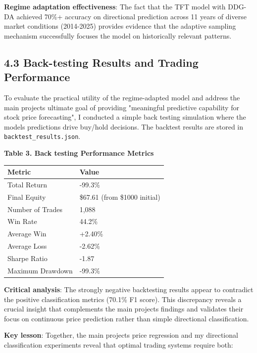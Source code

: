 \documentclass[
]{article}
\newcounter{none} %
\begin{document}
\textbf{Regime adaptation effectiveness}: The fact that the TFT model
with DDG-DA achieved 70\%+ accuracy on directional prediction across 11
years of diverse market conditions (2014-2025) provides evidence that
the adaptive sampling mechanism successfully focuses the model on
historically relevant patterns.

\subsection{4.3 Back-testing Results and Trading
Performance}\label{43-back-testing-results-and-trading-performance}

To evaluate the practical utility of the regime-adapted model and
address the main project\textquotesingle s ultimate goal of providing
"meaningful predictive capability for stock price forecasting", I
conducted a simple back testing simulation where the
model\textquotesingle s predictions drive buy/hold decisions. The
backtest results are stored in \texttt{backtest\_results.json}.

\textbf{Table 3. Back testing Performance Metrics}

{\def\LTcaptype{none} %
\begin{longtable}[]{@{}ll@{}}
\toprule\noalign{}
Metric & Value \\
\midrule\noalign{}
\endhead
\bottomrule\noalign{}
\endlastfoot
Total Return & -99.3\% \\
Final Equity & \$67.61 (from \$1000 initial) \\
Number of Trades & 1,088 \\
Win Rate & 44.2\% \\
Average Win & +2.40\% \\
Average Loss & -2.62\% \\
Sharpe Ratio & -1.87 \\
Maximum Drawdown & -99.3\% \\
\end{longtable}
}

\textbf{Critical analysis}: The strongly negative backtesting results
appear to contradict the positive classification metrics (70.1\% F1
score). This discrepancy reveals a crucial insight that complements the
main project\textquotesingle s findings and validates their focus on
continuous price prediction rather than simple directional
classification.

\textbf{Key lesson}: Together, the main project\textquotesingle s price
regression and my directional classification experiments reveal that
optimal trading systems require both:
\end{document}
